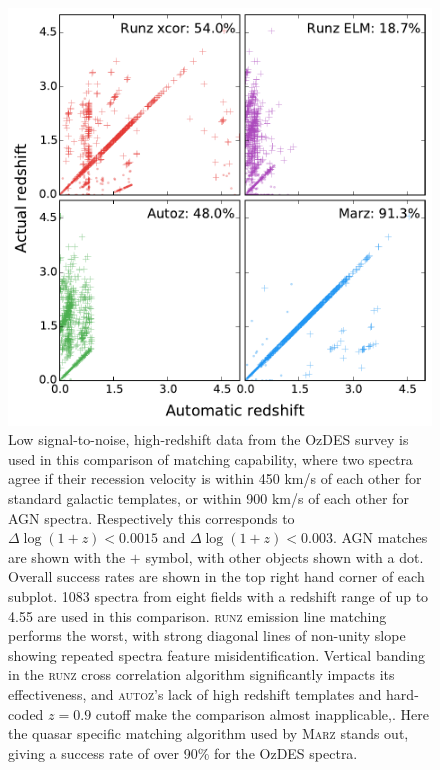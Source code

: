 \documentclass[iop]{emulateapj}
\newcommand{\runz}{\textsc{runz}}
\newcommand{\autoz}{\textsc{autoz}}
\newcommand{\marz}{\textsc{Marz}}
\begin{document}
\begin{figure}[t]
\centering
\includegraphics[width=\columnwidth]{run009Comp.pdf}
\caption{Low signal-to-noise, high-redshift data from the OzDES survey is used in this comparison of matching capability, where two spectra agree if their recession velocity is within 450 km/s of each other for standard galactic templates, or within 900 km/s of each other for AGN spectra. Respectively this corresponds to $\Delta \log(1+z) < 0.0015$ and $\Delta \log(1+z) < 0.003$. AGN matches are shown with the $+$ symbol, with other objects shown with a dot. Overall success rates are shown in the top right hand corner of each subplot. 1083 spectra from eight fields with a redshift range of up to 4.55 are used in this comparison. \runz{} emission line matching performs the worst, with strong diagonal lines of non-unity slope showing repeated spectra feature misidentification. Vertical banding in the \runz{} cross correlation algorithm significantly impacts its effectiveness, and \autoz{}'s lack of high redshift templates and hard-coded $z=0.9$ cutoff make the comparison almost inapplicable,. Here the quasar specific matching algorithm used by \marz{} stands out, giving a success rate of over 90\% for the OzDES spectra.}
\label{fig:low}
\end{figure}
\end{document}
